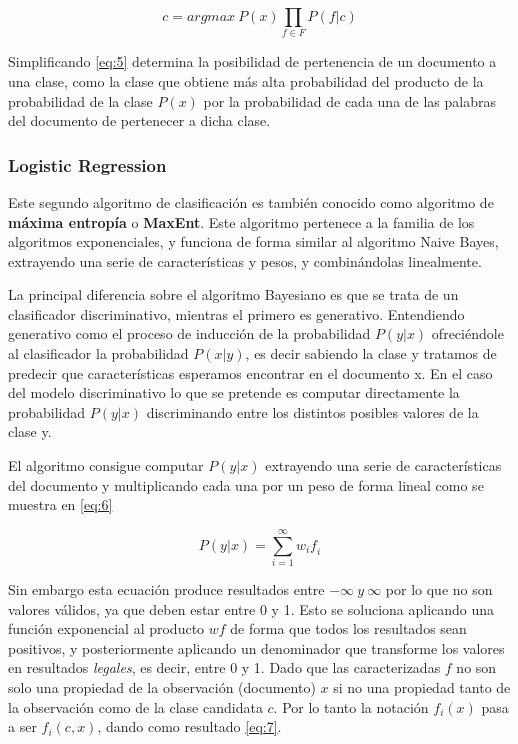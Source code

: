 \begin{equation} \label{eq:5}
\mathit{c = argmax\ P(x)\prod_{f \in F} P(f|c)}
\end{equation} 

Simplificando \ref{eq:5} determina la posibilidad de pertenencia de un documento a una clase, como la clase que obtiene más alta probabilidad del producto de la probabilidad de la clase \(P(x)\) por la probabilidad de cada una de las palabras del documento de pertenecer a dicha clase.


\subsubsection{Logistic Regression}\label{lr}

Este segundo algoritmo de clasificación es también conocido como algoritmo de \textbf{máxima entropía} o \textbf{MaxEnt}. Este algoritmo pertenece a la familia de los algoritmos exponenciales, y funciona de forma similar al algoritmo Naive Bayes, extrayendo una serie de características y pesos, y combinándolas linealmente.

La principal diferencia sobre el algoritmo Bayesiano es que se trata de un clasificador discriminativo, mientras el primero es generativo. Entendiendo generativo como el proceso de inducción de la probabilidad \(P(y|x)\) ofreciéndole al clasificador la probabilidad \(P(x|y)\), es decir sabiendo la clase y tratamos de predecir que características esperamos encontrar en el documento x. En el caso del modelo discriminativo lo que se pretende es computar directamente la probabilidad \(P(y|x)\) discriminando entre los distintos posibles valores de la clase y.

El algoritmo consigue computar \(P(y|x)\) extrayendo una serie de características del documento y multiplicando cada una por un peso de forma lineal como se muestra en \ref{eq:6}

\begin{equation}\label{eq:6}
\mathit{P(y|x) = \sum_{i=1}^{\infty} w_if_i}
\end{equation}

Sin embargo esta ecuación produce resultados entre \(-\infty\ y\ \infty\) por lo que no son valores válidos, ya que deben estar entre 0 y 1. Esto se soluciona aplicando una función exponencial al producto \(wf\) de forma que todos los resultados sean positivos, y posteriormente aplicando un denominador que transforme los valores en resultados \emph{legales}, es decir, entre 0 y 1.
Dado que las caracterizadas \(f\) no son solo una propiedad de la observación (documento) \(x\) si no una propiedad tanto de la observación como de la clase candidata \(c\). Por lo tanto la notación \(f_i(x)\) pasa a ser \(f_i(c,x)\), dando como resultado \ref{eq:7}.

